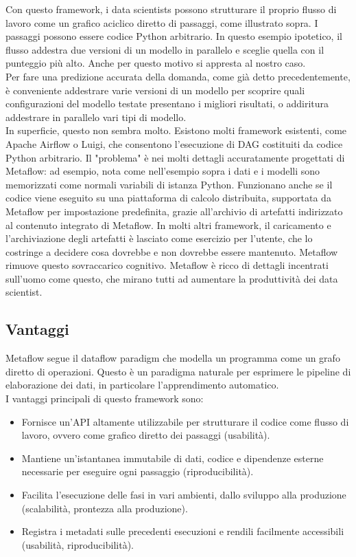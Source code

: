 \documentclass[12pt,a4paper]{report}
\begin{document}
Con questo framework, i data scientists possono strutturare il proprio flusso di lavoro come un grafico aciclico diretto di passaggi, come illustrato sopra. I passaggi possono essere codice Python arbitrario. In questo esempio ipotetico, il flusso addestra due versioni di un modello in parallelo e sceglie quella con il punteggio più alto. Anche per questo motivo si appresta al nostro caso.\\
Per fare una predizione accurata della domanda, come già detto precedentemente, è conveniente addestrare varie versioni di un modello per scoprire quali configurazioni del modello testate presentano i migliori risultati, o addiritura addestrare in parallelo vari tipi di modello.\\
In superficie, questo non sembra molto. Esistono molti framework esistenti, come Apache Airflow o Luigi, che consentono l'esecuzione di DAG costituiti da codice Python arbitrario. Il "problema" è nei molti dettagli accuratamente progettati di Metaflow: ad esempio, nota come nell'esempio sopra i dati e i modelli sono memorizzati come normali variabili di istanza Python. Funzionano anche se il codice viene eseguito su una piattaforma di calcolo distribuita, supportata da Metaflow per impostazione predefinita, grazie all'archivio di artefatti indirizzato al contenuto integrato di Metaflow. In molti altri framework, il caricamento e l'archiviazione degli artefatti è lasciato come esercizio per l'utente, che lo costringe a decidere cosa dovrebbe e non dovrebbe essere mantenuto. Metaflow rimuove questo sovraccarico cognitivo.
Metaflow è ricco di dettagli incentrati sull'uomo come questo, che mirano tutti ad aumentare la produttività dei data scientist.\\

\subsection{Vantaggi}
Metaflow segue il dataflow paradigm che modella un programma come un grafo diretto di operazioni. Questo è un paradigma naturale per esprimere le pipeline di elaborazione dei dati, in particolare l'apprendimento automatico.\\
I vantaggi principali di questo framework sono:
\begin{itemize}
    \item Fornisce un'API altamente utilizzabile per strutturare il codice come flusso di lavoro, ovvero come grafico diretto dei passaggi (usabilità).
    \item Mantiene un'istantanea immutabile di dati, codice e dipendenze esterne necessarie per eseguire ogni passaggio (riproducibilità).
    \item Facilita l'esecuzione delle fasi in vari ambienti, dallo sviluppo alla produzione (scalabilità, prontezza alla produzione).
    \item Registra i metadati sulle precedenti esecuzioni e rendili facilmente accessibili (usabilità, riproducibilità).
\end{itemize}
\end{document}
